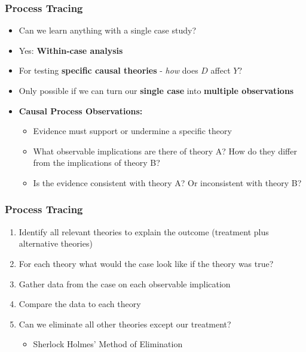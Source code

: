 \documentclass[xcolor=x11names,compress]{beamer}\usepackage[]{graphicx}\usepackage[]{color}
\renewcommand{\(}{\begin{columns}}
\renewcommand{\)}{\end{columns}}
\newcommand{\<}[1]{\begin{column}{#1}}
\renewcommand{\>}{\end{column}}
\begin{document}
\begin{frame}
\frametitle{Process Tracing}
\begin{itemize}
\item Can we learn anything with a single case study?
\pause
\item Yes: \textbf{Within-case analysis}
\pause
\item For testing \textbf{specific causal theories} - \textit{how} does $D$ affect $Y$?
\pause
\item Only possible if we can turn our \textbf{single case} into \textbf{multiple observations}
\pause
\item \textbf{Causal Process Observations:}
\begin{itemize}
\item Evidence must support or undermine a specific theory
\pause
\item What observable implications are there of theory A? How do they differ from the implications of theory B?
\pause
\item Is the evidence consistent with theory A? Or inconsistent with theory B?
\end{itemize}
\end{itemize}
\end{frame}

\begin{frame}
\frametitle{Process Tracing}
\begin{enumerate}
\item Identify all relevant theories to explain the outcome (treatment plus alternative theories)
\pause
\item For each theory what would the case look like if the theory was true?
\pause
\item Gather data from the case on each observable implication
\pause
\item Compare the data to each theory
\pause
\item Can we eliminate all other theories except our treatment?
\begin{itemize}
\item Sherlock Holmes' Method of Elimination
\end{itemize}
\end{enumerate}
\end{frame}
\end{document}
